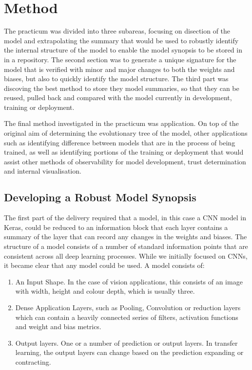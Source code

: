 \section{Method}

The practicum was divided into three subareas, focusing on disection of the model and extrapolating the summary that would be used to robustly identify the internal structure of the model to enable the model synopsis to be stored in in a repository. The second section was to generate a unique signature for the model that is verified with minor and major changes to both the weights and biases, but also to quickly identify the model structure. The third part was discoving the best method to store they model summaries, so that they can be reused, pulled back and compared with the model currently in development, training or deployment.

The final method investigated in the practicum was application. On top of the original aim of determining the evolutionary tree of the model, other applications such as identifying difference between models that are in the process of being trained, as well as identifying portions of the training or deployment that would assist other methods of observability for model development, trust determination and internal visualisation.

\subsection{Developing a Robust Model Synopsis}
The first part of the delivery required that a model, in this case a CNN model in Keras, could be reduced to an information block that each layer contains a summary of the layer that can record any changes in the weights and biases. The structure of a model consists of a number of standard information points that are consistent across all deep learning processes. While we initially focused on CNNs, it became clear that any model could be used. A model consists of:

\begin{enumerate}
\item An Input Shape. In the case of vision applications, this consists of an image with width, height and colour depth, which is usually three.
\item Dense Application Layers, such as Pooling, Convolution or reduction layers which can contain a heavily connected series of filters, activation functions and weight and bias metrics.
\item Output layers. One or a number of prediction or output layers. In transfer learning, the output layers can change based on the prediction expanding or contracting.
\end{enumerate}

